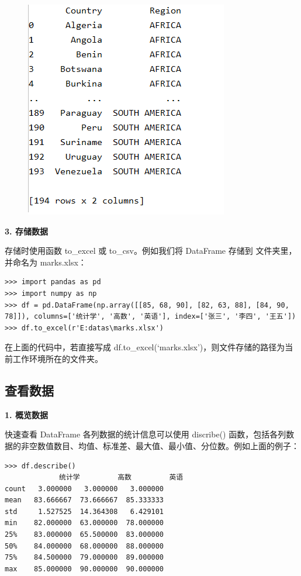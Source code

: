 \begin{figure}[!ht]
\centering
  \includegraphics[scale=0.7]{figure/chapter2/pandas7.png}
\end{figure}


\noindent\textbf{3. 存储数据}

存储时使用函数 to\_excel 或 to\_csv。例如我们将 DataFrame 存储到  文件夹里，并命名为 marks.xlsx：

\begin{lstlisting}[Language=Python]
>>> import pandas as pd
>>> import numpy as np
>>> df = pd.DataFrame(np.array([[85, 68, 90], [82, 63, 88], [84, 90, 78]]), columns=['统计学', '高数', '英语'], index=['张三', '李四', '王五'])
>>> df.to_excel(r'E:datas\marks.xlsx')
\end{lstlisting}

在上面的代码中，若直接写成 df.to\_excel(`marks.xlsx')，则文件存储的路径为当前工作环境所在的文件夹。


\subsection{查看数据}

\noindent\textbf{1. 概览数据}

快速查看 DataFrame 各列数据的统计信息可以使用 discribe() 函数，包括各列数据的非空数值数目、均值、标准差、最大值、最小值、分位数。例如上面的例子：

\begin{lstlisting}[Language=Python]
>>> df.describe()
             统计学         高数         英语
count   3.000000   3.000000   3.000000
mean   83.666667  73.666667  85.333333
std     1.527525  14.364308   6.429101
min    82.000000  63.000000  78.000000
25%    83.000000  65.500000  83.000000
50%    84.000000  68.000000  88.000000
75%    84.500000  79.000000  89.000000
max    85.000000  90.000000  90.000000
\end{lstlisting}


